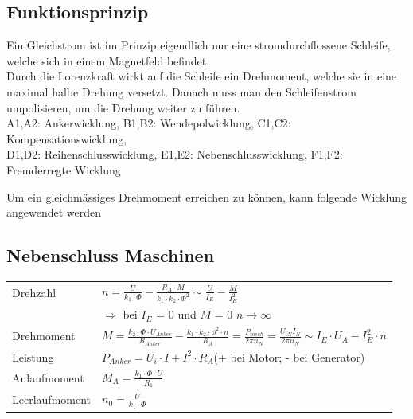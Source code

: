 	\subsection{Funktionsprinzip}
		Ein Gleichstrom ist im Prinzip eigendlich nur eine stromdurchflossene
		Schleife, welche sich in einem Magnetfeld befindet.\\
		Durch die Lorenzkraft wirkt auf die Schleife ein Drehmoment, welche sie in
		eine maximal halbe Drehung versetzt.
		Danach muss man den Schleifenstrom umpolisieren, um die Drehung weiter zu
		führen.\\
		A1,A2: Ankerwicklung, B1,B2: Wendepolwicklung, C1,C2: Kompensationswicklung, \\
		D1,D2: Reihenschlusswicklung, E1,E2: Nebenschlusswicklung, F1,F2: Fremderregte Wicklung
		
		Um ein gleichmässiges Drehmoment erreichen zu können, kann folgende Wicklung
		angewendet werden\\
		\begin{minipage}{10cm}
		\end{minipage}
		\begin{minipage}{7cm}
		\end{minipage}
		
	\subsection{Nebenschluss Maschinen}

		\begin{tabular}[c]{ | p{6cm} | p{9cm} |}
			\hline
			Drehzahl
			& $ n= \frac{U}{k_1 \cdot \Phi} - \frac{R_A \cdot M}{k_1 \cdot k_2 \cdot
			\Phi^2} \sim \frac{U}{I_E} - \frac{M}{I_E^2}$\\ 
			& $\Longrightarrow $ bei $I_E$ = 0 und $M$ = 0 $n \rightarrow \infty$\\
			\hline
			Drehmoment
			& $M=\frac{k_2 \cdot \Phi \cdot U_{Anker}}{R_{Anker}} - \frac{k_1 \cdot k_2
			\cdot\phi^2 \cdot n}{R_A} =\frac{P_{mech}}{2\pi
			n_N}=\frac{U_{iN}I_N}{2\pi n_N}\sim I_E \cdot U_A - I_E ^2 \cdot n$\\
			\hline
			Leistung
			& $P_{Anker}= U_i \cdot I \pm I^2 \cdot R_A $(+ bei Motor; - bei Generator)\\
			\hline
			Anlaufmoment
			& $M_A = \frac{k_1 \cdot \Phi \cdot U}{R_1}$\\
			\hline
			Leerlaufmoment
			& $n_0 = \frac{U}{k_1 \cdot \Phi}$\\
			\hline
		
		\end{tabular}

